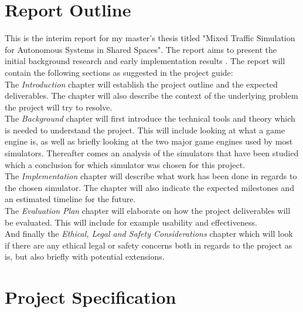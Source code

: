 \newcommand\tab[1][1cm]{\hspace*{#1}}

\section{Report Outline}
This is the interim report for my master's thesis titled "Mixed Traffic Simulation for Autonomous Systems in Shared Spaces". The report aims to present the initial background research and early implementation results \cite{studentGuideline}. The report will contain the following sections as suggested in the project guide:
\\ \tab The \emph{Introduction} chapter will establish the project outline and the expected deliverables. The chapter will also describe the context of the underlying problem the project will try to resolve.
\\ \tab The \emph{Background} chapter will first introduce the technical tools and theory which is needed to understand the project. This will include looking at what a game engine is, as well as briefly looking at the two major game engines used by most simulators. Thereafter comes an analysis of the simulators that have been studied which a conclusion for which simulator was chosen for this project. 
\\ \tab The \emph{Implementation} chapter will describe what work has been done in regards to the chosen simulator. The chapter will also indicate the expected milestones and an estimated timeline for the future. 
\\ \tab The \emph{Evaluation Plan} chapter will elaborate on how the project deliverables will be evaluated. This will include for example usability and effectiveness. 
\\ \tab And finally the \emph{Ethical, Legal and Safety Considerations} chapter which will look if there are any ethical legal or safety concerns both in regards to the project as is, but also briefly with potential extensions. 

\section{Project Specification} \label{ProjectSpec}
